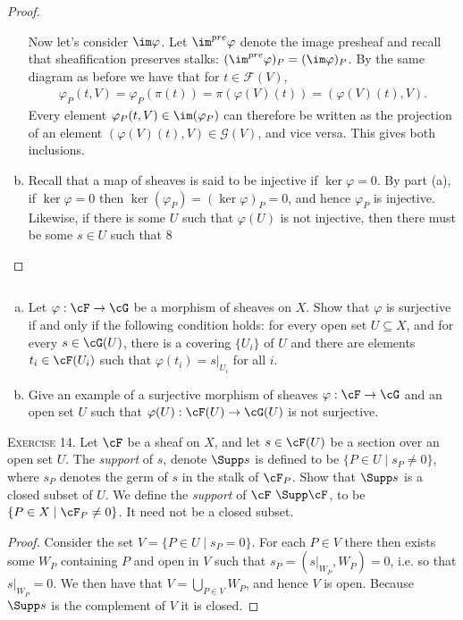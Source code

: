 \begin{problemset}
\begin{proof}
\begin{enumerate}[(a)]
                Now let's consider $\im\varphi$. Let $\im^{pre}\varphi$ denote the image presheaf and recall that sheafification preserves stalks: $(\im^{pre}\varphi)_P = (\im\varphi)_P$. By the same diagram as before we have that for $t\in \mathcal F(V)$,
                \begin{align*}
                  \varphi_P(t,V) = \varphi_P(\pi(t)) = \pi(\varphi(V)(t)) = (\varphi(V)(t),V).
                \end{align*}
                Every element $\varphi_P(t,V)\in \im(\varphi_P)$ can therefore be written as the projection of an element $(\varphi(V)(t),V)\in \mathcal G(V)$, and vice versa. This gives both inclusions.
          \item Recall that a map of sheaves is said to be injective if $\ker\varphi = 0$. By part (a), if $\ker\varphi = 0$ then $\ker(\varphi_P) = (\ker \varphi)_P = 0$, and hence $\varphi_P$ is injective. Likewise, if there is some $U$ such that $\varphi(U)$ is not injective, then there must be some $s\in U$ such that 8
		\end{enumerate}
	\end{proof}
	\item $ $
	\begin{enumerate}[(a)]
		\item  Let $\varphi:\cF\to \cG$ be a morphism of sheaves on $X$. Show that $\varphi$ is surjective if and only if the following condition holds: for every open set $U\subseteq X$, and for every $s \in \cG(U)$, there is a covering $\{U_i\}$ of $U$ and there are elements $t_i \in \cF(U_i)$ such that $\varphi(t_i) = s|_{U_i}$ for all $i$.
		\item Give an example of a surjective morphism of sheaves $\varphi:\cF\to \cG$ and an open set $U$ such that $\varphi(U):\cF(U)\to \cG(U)$ is not surjective.
	\end{enumerate}
	\item[\textsc{Exercise 14.}] Let $\cF$ be a sheaf on $X$, and let $s \in \cF(U)$ be a section over an open set $U$. The \emph{support} of $s$, denote $\Supp s$ is defined to be $\{P \in U \mid s_P \neq 0\}$, where $s_P$ denotes the germ of $s$ in the stalk of $\cF_P$. Show that $\Supp s$ is a closed subset of $U$. We define the \emph{support} of $\cF$ $\Supp \cF$, to be $\{P\in X \mid \cF_P \neq 0\}$. It need not be a closed subset.
	\begin{proof}
		Consider the set $V = \{P \in U \mid s_P = 0\}$. For each $P\in V$ there then exists some $W_P$ containing $P$ and open in $V$ such that $s_P = (s|_{W_P}, W_P) = 0$, i.e. so that $s|_{W_P} = 0$. We then have that $V = \bigcup_{P \in V} W_P$, and hence $V$ is open. Because $\Supp s$ is the complement of $V$ it is closed.


\end{proof}
\end{problemset}
